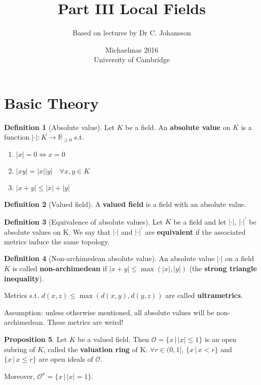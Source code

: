 \documentclass[a4paper]{article}
\title{Part III Local Fields}
\author{Based on lectures by Dr C. Johansson}
\date{Michaelmas 2016\\University of Cambridge}
\theoremstyle{definition}
\newtheorem{definition}{Definition}
\theoremstyle{default}
\newtheorem{prop}[definition]{Proposition}
\theoremstyle{remark}
\newcommand*\abs[1]{\left|#1\right|}
\begin{document}
\maketitle
\tableofcontents

\section{Basic Theory}
\begin{definition}[Absolute value]
	Let $K$ be a field. An \textbf{absolute value} on $K$ is a function $\abs{\cdot}:K\to\mathbb{R}_{\geq 0}$ s.t.
	\begin{enumerate}[label=\roman*.]
		\item $\abs{x}=0 \iff x=0$
		\item $\abs{xy}=\abs{x}\abs{y} \quad \forall x,y \in K$
		\item $\abs{x+y} \leq \abs{x} + \abs{y}$
	\end{enumerate}
\end{definition}

\begin{definition}[Valued field]
	A \textbf{valued field} is a field with an absolute value.
\end{definition}

\begin{definition}[Equivalence of absolute values]
	Let $K$ be a field and let $\abs{\cdot}$, $\abs{\cdot}^{'}$ be absolute values on K.
	We say that $\abs{\cdot}$ and $\abs{\cdot}^{'}$ are \textbf{equivalent} if the associated metrics induce the same topology.
\end{definition}
\setcounter{definition}{5}
\begin{definition}[Non-archimedean absolute value]
	An absolute value $\abs{\cdot}$ on a field $K$ is called \textbf{non-archimedean} if $\abs{x+y}\leq\max(\abs{x},\abs{y})$ (the \textbf{strong triangle inequality}).
	
	Metrics s.t. $d(x,z)\leq\max(d(x,y),d(y,z))$ are called \textbf{ultrametrics}.
\end{definition}

Assumption: unless otherwise mentioned, all absolute values will be non-archimedean.
These metrics are weird!

\begin{prop}
	Let $K$ be a valued field.
	Then $\mathcal{O}=\{x \,|\, \abs{x}\leq 1\}$ is an open subring of $K$, called the \textbf{valuation ring} of K.
	$\forall r \in (0,1]$, $\{x \,|\, x < r\}$ and $\{x \,|\, x \leq r\}$ are open ideals of $\mathcal{O}$.
	
	Moreover, $\mathcal{O}^x = \{x \,|\, \abs{x}=1\}$.
\end{prop}
\end{document}
